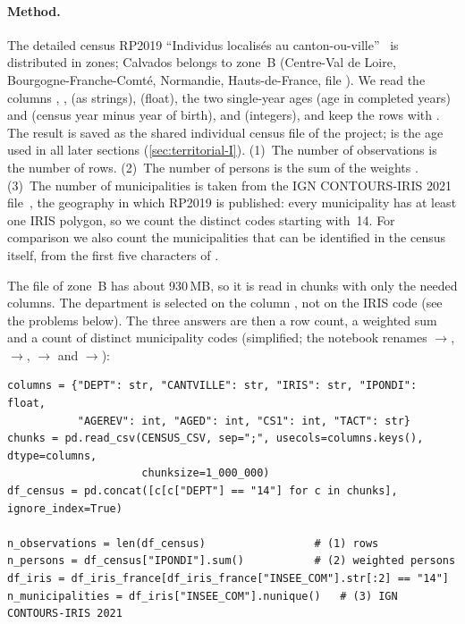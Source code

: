 \paragraph{Method.}
The detailed census RP2019 ``Individus localis\'es au canton-ou-ville''~\cite{insee-census-detailed} is distributed in
zones; Calvados belongs to zone~B (Centre-Val de Loire, Bourgogne-Franche-Comt\'e, Normandie, Hauts-de-France,
file ). We read the columns , ,  (as strings),
 (float), the two single-year ages  (age in completed years) and  (census year
minus year of birth), and  (integers), and keep the rows with . The result is saved as the
shared individual census file of the project;  is the age used in all later sections
(\cref{sec:territorial-I}).
(1)~The number of observations is the number of rows. (2)~The number of persons is the sum of the weights .
(3)~The number of municipalities is taken from the IGN CONTOURS-IRIS 2021 file~\cite{ign-contours-iris}, the
geography in which RP2019 is published: every municipality has at least one IRIS polygon, so we count the distinct
codes  starting with~14. For comparison we also count the municipalities that can be identified in the
census itself, from the first five characters of .

The file of zone~B has about 930\,MB, so it is read in chunks with only the needed columns. The department is
selected on the column , not on the IRIS code (see the problems below). The three answers are then a row
count, a weighted sum and a count of distinct municipality codes (simplified; the notebook renames
$\to$, $\to$, $\to$ and
$\to$):
\begin{lstlisting}[style=py]
columns = {"DEPT": str, "CANTVILLE": str, "IRIS": str, "IPONDI": float,
           "AGEREV": int, "AGED": int, "CS1": int, "TACT": str}
chunks = pd.read_csv(CENSUS_CSV, sep=";", usecols=columns.keys(), dtype=columns,
                     chunksize=1_000_000)
df_census = pd.concat([c[c["DEPT"] == "14"] for c in chunks], ignore_index=True)

n_observations = len(df_census)                 # (1) rows
n_persons = df_census["IPONDI"].sum()           # (2) weighted persons
df_iris = df_iris_france[df_iris_france["INSEE_COM"].str[:2] == "14"]
n_municipalities = df_iris["INSEE_COM"].nunique()   # (3) IGN CONTOURS-IRIS 2021
\end{lstlisting}

